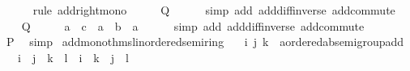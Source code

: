 \begin{isabellebody}
\ \ \ \ \isamarkupfalse%
\ {\isacharparenleft}{\kern0pt}rule\ add{\isacharunderscore}{\kern0pt}right{\isacharunderscore}{\kern0pt}mono{\isacharparenright}{\kern0pt}\isanewline
\ \ \isamarkupfalse%
\ \isamarkupfalse%
\ {\isacharquery}{\kern0pt}Q\isanewline
\ \ \ \ \isamarkupfalse%
\ {\isacharparenleft}{\kern0pt}simp\ add{\isacharcolon}{\kern0pt}\ add{\isacharunderscore}{\kern0pt}diff{\isacharunderscore}{\kern0pt}inverse\ add{\isachardot}{\kern0pt}commute{\isacharparenright}{\kern0pt}\isanewline
{}\isamarkupfalse%
\isanewline
\ \ \isamarkupfalse%
\ {\isacharquery}{\kern0pt}Q\isanewline
\ \ \isamarkupfalse%
\ \isamarkupfalse%
\ {\isachardoublequoteopen}a\ {\isacharplus}{\kern0pt}\ c\ {\isasymle}\ a\ {\isacharplus}{\kern0pt}\ {\isacharparenleft}{\kern0pt}b\ {\isacharminus}{\kern0pt}\ a{\isacharparenright}{\kern0pt}{\isachardoublequoteclose}\isanewline
\ \ \ \ \isamarkupfalse%
\ {\isacharparenleft}{\kern0pt}simp\ add{\isacharcolon}{\kern0pt}\ add{\isacharunderscore}{\kern0pt}diff{\isacharunderscore}{\kern0pt}inverse\ add{\isachardot}{\kern0pt}commute{\isacharparenright}{\kern0pt}\isanewline
\ \ \isamarkupfalse%
\ \isamarkupfalse%
\ {\isacharquery}{\kern0pt}P\ \isamarkupfalse%
\ simp\isanewline
{}\isamarkupfalse%
%
\endisatagproof
{\isafoldproof}%
%
\isadelimproof
\isanewline
%
\endisadelimproof
\isanewline
{}\isamarkupfalse%
\isanewline
\isanewline
{}\isamarkupfalse%
%
\isadelimdocument
%
\endisadelimdocument
%
\isatagdocument
%
\isamarkuptrue%
%
\endisatagdocument
{\isafolddocument}%
%
\isadelimdocument
%
\endisadelimdocument
{}\isamarkupfalse%
\ add{\isacharunderscore}{\kern0pt}mono{\isacharunderscore}{\kern0pt}thms{\isacharunderscore}{\kern0pt}linordered{\isacharunderscore}{\kern0pt}semiring{\isacharcolon}{\kern0pt}\isanewline
\ \ \ i\ j\ k\ {\isacharcolon}{\kern0pt}{\isacharcolon}{\kern0pt}\ {\isachardoublequoteopen}{\isacharprime}{\kern0pt}a{\isacharcolon}{\kern0pt}{\isacharcolon}{\kern0pt}ordered{\isacharunderscore}{\kern0pt}ab{\isacharunderscore}{\kern0pt}semigroup{\isacharunderscore}{\kern0pt}add{\isachardoublequoteclose}\isanewline
\ \ \ {\isachardoublequoteopen}i\ {\isasymle}\ j\ {\isasymand}\ k\ {\isasymle}\ l\ {\isasymLongrightarrow}\ i\ {\isacharplus}{\kern0pt}\ k\ {\isasymle}\ j\ {\isacharplus}{\kern0pt}\ l{\isachardoublequoteclose}\isanewline

\end{isabellebody}
